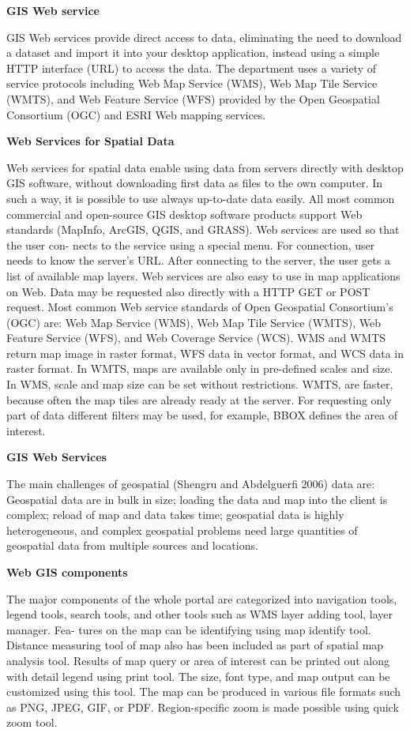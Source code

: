 \documentclass[]{book}
\begin{document}
\textbf{GIS Web service}

GIS Web services provide direct access to data, eliminating
the need to download a dataset and import it into your
desktop application, instead using a simple HTTP interface
(URL) to access the data. The department uses a variety of
service protocols including Web Map Service (WMS), Web
Map Tile Service (WMTS), and Web Feature Service (WFS) provided by the Open Geospatial Consortium
(OGC) and ESRI Web mapping services.

\textbf{Web Services for Spatial Data}

Web services for spatial data enable using data from servers
directly with desktop GIS software, without downloading
first data as files to the own computer. In such a way, it is
possible to use always up-to-date data easily. All most
common commercial and open-source GIS desktop software
products support Web standards (MapInfo, ArcGIS, QGIS,
and GRASS). Web services are used so that the user con-
nects to the service using a special menu. For connection,
user needs to know the server's URL. After connecting to
the server, the user gets a list of available map layers. Web
services are also easy to use in map applications on Web.
Data may be requested also directly with a HTTP GET or
POST request.
Most common Web service standards of Open Geospatial
Consortium's (OGC) are: Web Map Service (WMS), Web
Map Tile Service (WMTS), Web Feature Service (WFS),
and Web Coverage Service (WCS).
WMS and WMTS return map image in raster format,
WFS data in vector format, and WCS data in raster format.
In WMTS, maps are available only in pre-defined scales and
size. In WMS, scale and map size can be set without
restrictions. WMTS, are faster, because often the map tiles
are already ready at the server. For requesting only part of
data different filters may be used, for example, BBOX
defines the area of interest.

\textbf{GIS Web Services}

The main challenges of geospatial (Shengru and Abdelguerfi
2006) data are:
Geospatial data are in bulk in size; loading the data and map
into the client is complex; reload of map and data takes time;
geospatial data is highly heterogeneous, and complex
geospatial problems need large quantities of geospatial data
from multiple sources and locations.

\textbf{Web GIS components}

The major components of the whole portal are categorized
into navigation tools, legend tools, search tools, and other
tools such as WMS layer adding tool, layer manager. Fea-
tures on the map can be identifying using map identify tool.
Distance measuring tool of map also has been included as
part of spatial map analysis tool. Results of map query or
area of interest can be printed out along with detail legend
using print tool. The size, font type, and map output can be
customized using this tool. The map can be produced in
various file formats such as PNG, JPEG, GIF, or PDF.
Region-specific zoom is made possible using quick zoom
tool.
\end{document}
